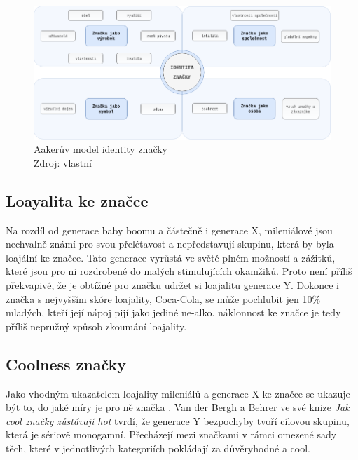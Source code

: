 \medskip
\begin{figure}[htbp!]
    \centering
    \includegraphics[width=.95\textwidth]{assets/aaker-model.png}
    \caption[Aakerův model identity značky]{Aakerův model identity značky \\ Zdroj: vlastní}
    \label{fig:aaker-brand-identity-model}
\end{figure}

\subsection{Loayalita ke značce}
Na rozdíl od generace baby boomu a částečně i generace X, mileniálové jsou nechvalně známí pro svou přelétavost a nepředstavují skupinu, která by byla loajální ke značce. Tato generace vyrůstá ve světě plném možností a zážitků, které jsou pro ni rozdrobené do malých stimulujících okamžiků. Proto není příliš překvapivé, že je obtížné pro značku udržet si loajalitu generace Y. Dokonce i značka s nejvyšším skóre loajality, Coca-Cola, se může pochlubit jen 10\rm \% mladých, kteří její nápoj pijí jako jediné ne-alko.  náklonnost ke značce je tedy příliš nepružný způsob zkoumání loajality.\cite{bergh2012coolznacky}

\subsection*{Coolness značky}
Jako vhodným ukazatelem loajality mileniálů a generace X ke značce se ukazuje být to, do jaké míry je pro ně značka . Van der Bergh a Behrer ve své knize \textit{Jak cool značky zůstávají hot} tvrdí, že generace Y bezpochyby tvoří cílovou skupinu, která je sériově monogamní. Přecházejí mezi značkami v rámci omezené sady těch, které v jednotlivých kategoriích pokládají za důvěryhodné a cool.\cite[s. 90]{bergh2012coolznacky}

